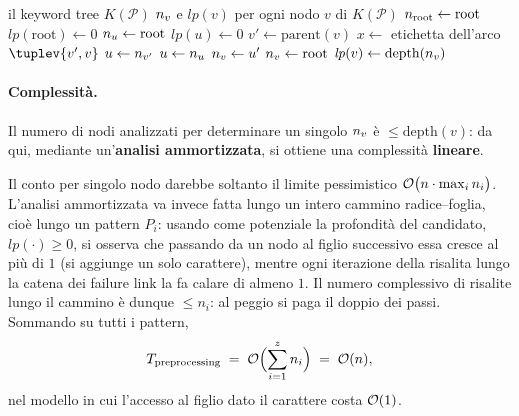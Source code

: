 \begin{algorithm}[H]
\caption{Calcolo dei failure link di $K(\mathcal{P})$}
\label{alg:failure-link}
\begin{algorithmic}[1]
\Require il keyword tree $K(\mathcal{P})$
\Ensure $n_{v}$ e $\mathit{lp}(v)$ per ogni nodo $v$ di $K(\mathcal{P})$
\State $n_{\mathrm{root}} \gets \mathrm{root}$
\State $\mathit{lp}(\mathrm{root}) \gets 0$
  \State $n_{u} \gets \mathrm{root}$
  \State $\mathit{lp}(u) \gets 0$
\EndFor
{}
    \State $v' \gets \mathrm{parent}(v)$
    \State $x \gets$ etichetta dell'arco $\tuplev{v', v}$
    \State $u \gets n_{v'}$
      \State $u \gets n_{u}$
    \EndWhile
      \State $n_{v} \gets u'$
    \Else
      \State $n_{v} \gets \mathrm{root}$
    \EndIf
    \State $\mathit{lp}(v) \gets \mathrm{depth}(n_{v})$
  \EndFor
\EndFor
\end{algorithmic}
\end{algorithm}

\paragraph{Complessità.}
Il numero di nodi analizzati per determinare un singolo $n_{v}$ è
$\le \mathrm{depth}(v)$: da qui, mediante un'\textbf{analisi ammortizzata}, si ottiene una
complessità \textbf{lineare}.

\begin{osservazione}
Il conto per singolo nodo darebbe soltanto il limite pessimistico
$\mathcal{O}\bigl(n \cdot \max_i n_i\bigr)$. L'analisi ammortizzata va invece fatta lungo un intero
cammino radice--foglia, cioè lungo un pattern $P_i$: usando come potenziale la profondità
del candidato, $\mathit{lp}(\cdot) \ge 0$, si osserva che passando da un nodo al figlio
successivo essa cresce al più di $1$ (si aggiunge un solo carattere), mentre ogni iterazione
della risalita lungo la catena dei failure link la fa calare di almeno $1$. Il numero
complessivo di risalite lungo il cammino è dunque $\le n_i$: al peggio si paga il doppio dei
passi. Sommando su tutti i pattern,
\[
  T_{\text{preprocessing}} \;=\; \mathcal{O}\Bigl(\sum_{i=1}^{z} n_i\Bigr) \;=\; \mathcal{O}(n),
\]
nel modello in cui l'accesso al figlio dato il carattere costa $\mathcal{O}(1)$.
\end{osservazione}

